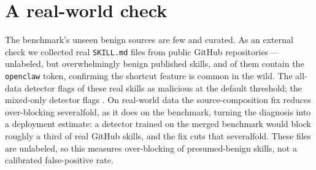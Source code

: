\section{A real-world check}
\label{sec:wild}
The benchmark's unseen benign sources are few and curated. As an external check we collected \WildN{}
real \texttt{SKILL.md} files from public GitHub repositories\,---\,unlabeled, but overwhelmingly benign
published skills, and \WildOpenclaw{} of them contain the \texttt{openclaw} token, confirming the
shortcut feature is common in the wild. The all-data detector flags \WildFlaggedAll{} of these real
skills as malicious at the default threshold; the mixed-only detector flags \WildFlaggedMixed{}. On
real-world data the source-composition fix reduces over-blocking severalfold, as it does on the
benchmark, turning the diagnosis into a deployment estimate: a detector trained on the merged benchmark
would block roughly a third of real GitHub skills, and the fix cuts that severalfold. These files are
unlabeled, so this measures over-blocking of presumed-benign skills, not a calibrated false-positive
rate.

